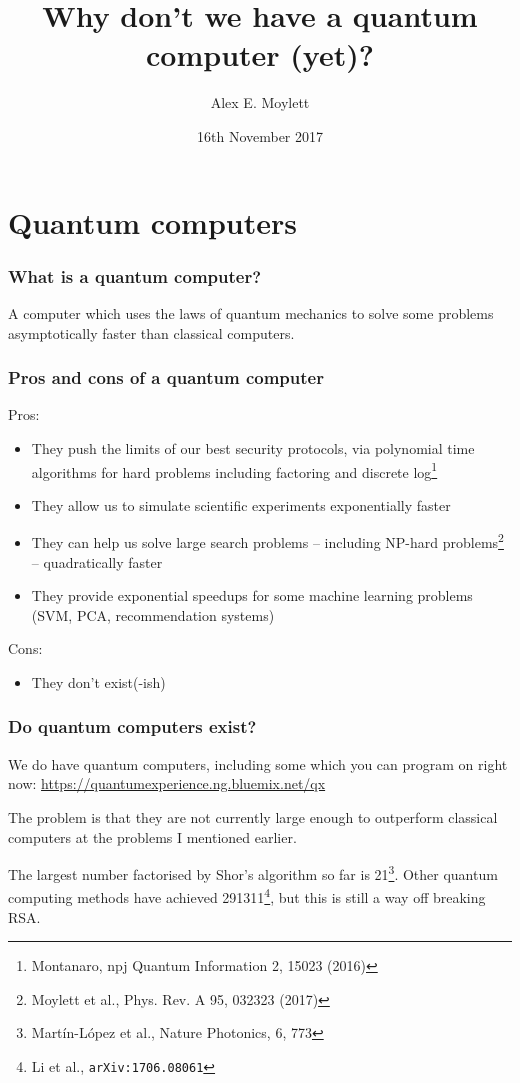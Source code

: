\documentclass[]{beamer}
\title[Why don't we have a quantum computer?]{Why don't we have a quantum computer (yet)?} %
\author[Alex E. Moylett]{Alex E. Moylett} %
\institute[University of Bristol] %
{
Quantum Engineering Technology Labs and Quantum Engineering Centre for Doctoral Training\\
University of Bristol \\ %
\medskip
\textit{\href{mailto:alex.moylett@bristol.ac.uk}{alex.moylett@bristol.ac.uk}} %
}
\date{16th November 2017} %
\begin{document}
\begin{frame}
\titlepage %
\end{frame}


\section{Quantum computers}

\begin{frame}
\frametitle{What is a quantum computer?}
A computer which uses the laws of quantum mechanics to solve some problems asymptotically faster than classical computers.
\end{frame}

\begin{frame}
\frametitle{Pros and cons of a quantum computer}

Pros:
\begin{itemize}
\item<2-> They push the limits of our best security protocols, via polynomial time algorithms for hard problems including factoring and discrete log\footnote{Montanaro, npj Quantum Information 2, 15023 (2016)}
\item<3-> They allow us to simulate scientific experiments exponentially faster
\item<4-> They can help us solve large search problems -- including NP-hard problems\footnote{Moylett et al., Phys. Rev. A 95, 032323 (2017)} -- quadratically faster
\item<5-> They provide exponential speedups for some machine learning problems (SVM, PCA, recommendation systems)
\end{itemize}

Cons:
\begin{itemize}
\item<6-> They don't exist(-ish)
\end{itemize}
\end{frame}

\begin{frame}
\frametitle{Do quantum computers exist?}

We do have quantum computers, including some which you can program on right now: \url{https://quantumexperience.ng.bluemix.net/qx}

The problem is that they are not currently large enough to outperform classical computers at the problems I mentioned earlier.

The largest number factorised by Shor's algorithm so far is 21\footnote{Mart\'in-L\'opez et al., Nature Photonics, 6, 773}. Other quantum computing methods have achieved 291311\footnote{Li et al., {\tt arXiv:1706.08061}}, but this is still a way off breaking RSA.
\end{frame}
\end{document}
